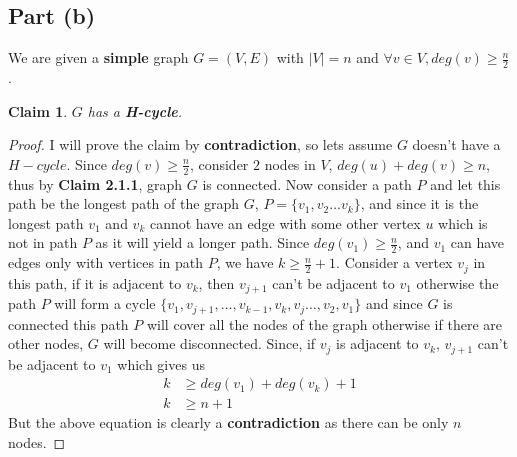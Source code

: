 \documentclass{article}
\let\bold\textbf
\newtheorem{claim}{Claim}[subsection]
\begin{document}
{  \subsection{Part (b)}{
    We are given a \bold{simple} graph $G=(V,E)$ with $\mid V\mid =n$ and $\forall v \in V, deg(v)\geq \frac{n}{2}$.
    \begin{claim}
      $G$ has a \bold{H-cycle}.
    \end{claim}
    \begin{proof}
      I will prove the claim by \bold{contradiction}, so lets assume $G$ doesn't have a $H-cycle$. \newline
      Since $deg(v)\geq \frac{n}{2}$, consider $2$ nodes in $V$, $deg(u)+deg(v) \geq n$, thus by \bold{Claim 2.1.1}, graph $G$ is connected. \newline
      Now consider a path $P$ and let this path be the longest path of the graph $G$, $P=\{v_1,v_2\dots v_k\}$, and since it is the longest path $v_1$ and $v_k$ cannot have an edge with some other vertex $u$ which is not in path $P$ as it will yield a longer path. \newline
      Since $deg(v_1) \geq \frac{n}{2}$, and $v_1$ can have edges only with vertices in path $P$, we have $k \geq \frac{n}{2} +1$. \newline
      Consider a vertex $v_j$ in this path, if it is adjacent to $v_k$, then $v_{j+1}$ can't be adjacent to $v_1$ otherwise the path $P$ will form a cycle $\{v_1,v_{j+1},\dots,v_{k-1},v_k,v_j\dots,v_2,v_1\}$ and since $G$ is connected this path $P$ will cover all the nodes of the graph otherwise if there are other nodes, $G$ will become disconnected. \newline
      Since, if $v_j$ is adjacent to $v_k$, $v_{j+1}$ can't be adjacent to $v_1$ which gives us
      \begin{align*}
        k &\geq deg(v_1)+deg(v_k)+1 \\
        k &\geq n+1
      \end{align*}
      But the above equation is clearly a \bold{contradiction} as there can be only $n$ nodes.
    \end{proof}
  }
}
\newpage
\end{document}
